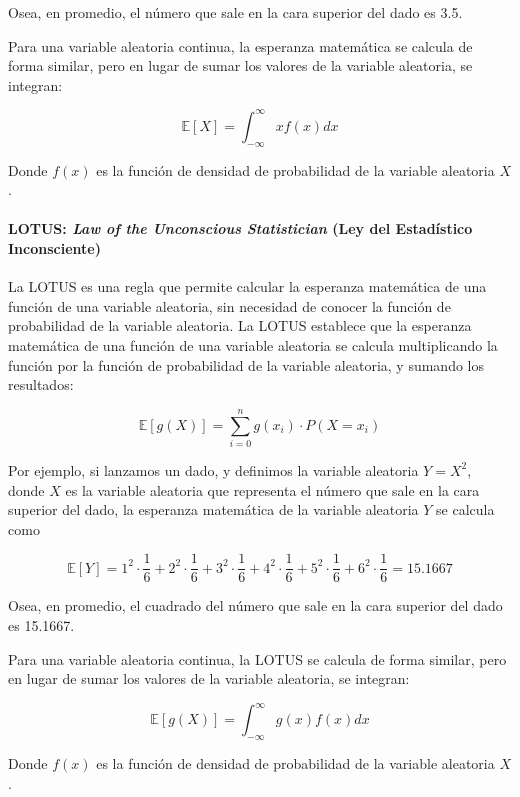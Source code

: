 Osea, en promedio, el número que sale en la cara superior del dado es
3.5.

Para una variable aleatoria continua, la esperanza matemática se calcula
de forma similar, pero en lugar de sumar los valores de la variable
aleatoria, se integran:

\[
\mathbb{E}[X] = \int_{-\infty}^{\infty} xf(x)dx
\]

Donde \(f(x)\) es la función de densidad de probabilidad de la variable
aleatoria \(X\).

\paragraph{\texorpdfstring{LOTUS: \emph{Law of the Unconscious
Statistician} (Ley del Estadístico
Inconsciente)}{LOTUS: Law of the Unconscious Statistician (Ley del Estadístico Inconsciente)}}\label{lotus-law-of-the-unconscious-statistician-ley-del-estaduxedstico-inconsciente}

La LOTUS es una regla que permite calcular la esperanza matemática de
una función de una variable aleatoria, sin necesidad de conocer la
función de probabilidad de la variable aleatoria. La LOTUS establece que
la esperanza matemática de una función de una variable aleatoria se
calcula multiplicando la función por la función de probabilidad de la
variable aleatoria, y sumando los resultados:

\[
\mathbb{E}[g(X)] = \sum_{i=0}^n g(x_i) \cdot P(X=x_i)
\]

Por ejemplo, si lanzamos un dado, y definimos la variable aleatoria
\(Y = X^2\), donde \(X\) es la variable aleatoria que representa el
número que sale en la cara superior del dado, la esperanza matemática de
la variable aleatoria \(Y\) se calcula como

\[
\mathbb{E}[Y] = 1^2 \cdot \frac{1}{6} + 2^2 \cdot \frac{1}{6} + 3^2 \cdot \frac{1}{6} + 4^2 \cdot \frac{1}{6} + 5^2 \cdot \frac{1}{6} + 6^2 \cdot \frac{1}{6} = 15.1667
\]

Osea, en promedio, el cuadrado del número que sale en la cara superior
del dado es 15.1667.

Para una variable aleatoria continua, la LOTUS se calcula de forma
similar, pero en lugar de sumar los valores de la variable aleatoria, se
integran:

\[
\mathbb{E}[g(X)] = \int_{-\infty}^{\infty} g(x)f(x)dx
\]

Donde \(f(x)\) es la función de densidad de probabilidad de la variable
aleatoria \(X\).

